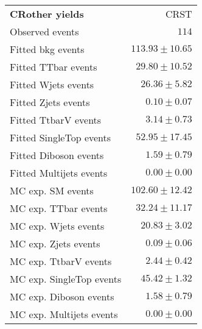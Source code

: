 

\begin{table}[h!]
\begin{center}
\setlength{\tabcolsep}{0.0pc}
{\small
\begin{tabular*}{\textwidth}{@{\extracolsep{\fill}}lr}
\noalign{\smallskip}\hline\noalign{\smallskip}
{\bf CRother yields}             & CRST              \\[-0.05cm]
\noalign{\smallskip}\hline\noalign{\smallskip}
Observed events                & $114$                    \\
\noalign{\smallskip}\hline\noalign{\smallskip}
Fitted bkg events                & $113.93 \pm 10.65$              \\
\noalign{\smallskip}\hline\noalign{\smallskip}
        Fitted TTbar events              & $29.80 \pm 10.52$              \\
        Fitted Wjets events           & $26.36 \pm 5.82$              \\
        Fitted Zjets events              & $0.10 \pm 0.07$              \\
        Fitted TtbarV events             & $3.14 \pm 0.73$              \\
        Fitted SingleTop events            & $52.95 \pm 17.45$              \\
        Fitted Diboson events                & $1.59 \pm 0.79$              \\
        Fitted Multijets events                & $0.00 \pm 0.00$              \\
 \noalign{\smallskip}\hline\noalign{\smallskip}
MC exp. SM events                    & $102.60 \pm 12.42$              \\
\noalign{\smallskip}\hline\noalign{\smallskip}
        MC exp. TTbar events             & $32.24 \pm 11.17$              \\
        MC exp. Wjets events             & $20.83 \pm 3.02$              \\
        MC exp. Zjets events                & $0.09 \pm 0.06$              \\
        MC exp. TtbarV events              & $2.44 \pm 0.42$              \\
        MC exp. SingleTop events            & $45.42 \pm 1.32$              \\
        MC exp. Diboson events                & $1.58 \pm 0.79$              \\
        MC exp. Multijets events             & $0.00 \pm 0.00$              \\

\end{tabular*}}
\end{center}
\end{table}
